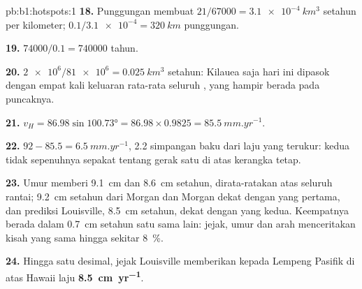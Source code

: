 \begin{solution}{pb:b1:hotspots:1}
\textbf{18.} Punggungan membuat $21/67000 = \qty{3.1e-4}{km^3}$ setahun per kilometer;
$0.1/\num{3.1e-4} = \qty{320}{km}$ punggungan.

\textbf{19.} $74000/0.1 = \num{740000}$ tahun.

\textbf{20.} $\num{2e6}/\num{81e6} = \qty{0.025}{km^3}$ setahun: Kilauea saja hari ini
dipasok dengan empat kali keluaran rata-rata seluruh , yang hampir berada pada
puncaknya.

\textbf{21.} $v_H = 86.98\sin\ang{100.73} = 86.98\times0.9825 =
\qty{85.5}{mm.yr^{-1}}$.

\textbf{22.} $92 - 85.5 = \qty{6.5}{mm.yr^{-1}}$, 2.2 simpangan baku dari laju yang terukur:
kedua  tidak sepenuhnya sepakat tentang gerak satu  di atas kerangka tetap.

\textbf{23.} Umur memberi \qty{9.1}{cm} dan \qty{8.6}{cm} setahun, dirata-ratakan
atas seluruh rantai; \qty{9.2}{cm} setahun dari Morgan dan Morgan dekat dengan yang pertama,
dan prediksi Louisville, \qty{8.5}{cm} setahun, dekat dengan yang kedua. Keempatnya berada dalam
\qty{0.7}{cm} setahun satu sama lain: jejak, umur dan arah menceritakan kisah yang sama hingga
sekitar \qty{8}{\percent}.

\textbf{24.} Hingga satu desimal, jejak Louisville memberikan kepada Lempeng Pasifik di atas
 Hawaii laju
\textbf{\qty[text-series-to-math=true]{8.5}{cm.yr^{-1}}}.
\end{solution}
